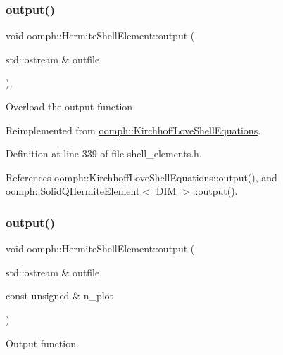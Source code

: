 \subsubsection{\texorpdfstring{output()}{output()}\hspace{0.1cm}{\footnotesize\ttfamily [1/4]}}
{\footnotesize\ttfamily void oomph\+::\+Hermite\+Shell\+Element\+::output (\begin{DoxyParamCaption}\item[{std\+::ostream \&}]{outfile }\end{DoxyParamCaption})\hspace{0.3cm}{\ttfamily [inline]}, {\ttfamily [virtual]}}



Overload the output function. 



Reimplemented from \hyperlink{classoomph_1_1KirchhoffLoveShellEquations_a78954c3bd74225e91c7433c0009860dc}{oomph\+::\+Kirchhoff\+Love\+Shell\+Equations}.



Definition at line 339 of file shell\+\_\+elements.\+h.



References oomph\+::\+Kirchhoff\+Love\+Shell\+Equations\+::output(), and oomph\+::\+Solid\+Q\+Hermite\+Element$<$ D\+I\+M $>$\+::output().

\mbox{\label{classoomph_1_1HermiteShellElement_a2f76280c3af060304800b5bc0aeb02d8}} 
\subsubsection{\texorpdfstring{output()}{output()}\hspace{0.1cm}{\footnotesize\ttfamily [2/4]}}
{\footnotesize\ttfamily void oomph\+::\+Hermite\+Shell\+Element\+::output (\begin{DoxyParamCaption}\item[{std\+::ostream \&}]{outfile,  }\item[{const unsigned \&}]{n\+\_\+plot }\end{DoxyParamCaption})\hspace{0.3cm}{\ttfamily [virtual]}}



Output function. 

